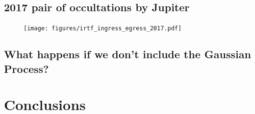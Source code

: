 \documentclass[modern]{aastex62}
\begin{document}
\subsection{2017 pair of occultations by Jupiter}

\begin{figure}[ht!]
    \begin{centering}
    \texttt{[image: figures/irtf\_ingress\_egress\_2017.pdf]}
    \end{centering}
\end{figure}

\subsection{What happens if we don't include the Gaussian Process?}


\section{Conclusions}
\label{sec:conclusions}
\clearpage


\end{document}
